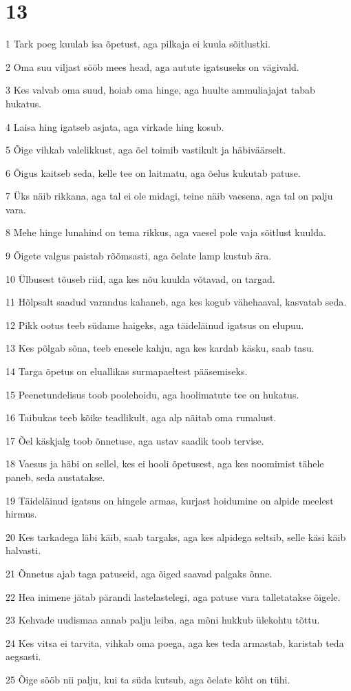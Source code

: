 \chapter{13}

\par 1 Tark poeg kuulab isa õpetust, aga pilkaja ei kuula sõitlustki.
\par 2 Oma suu viljast sööb mees head, aga autute igatsuseks on vägivald.
\par 3 Kes valvab oma suud, hoiab oma hinge, aga huulte ammuliajajat tabab hukatus.
\par 4 Laisa hing igatseb asjata, aga virkade hing kosub.
\par 5 Õige vihkab valelikkust, aga õel toimib vastikult ja häbiväärselt.
\par 6 Õigus kaitseb seda, kelle tee on laitmatu, aga õelus kukutab patuse.
\par 7 Üks näib rikkana, aga tal ei ole midagi, teine näib vaesena, aga tal on palju vara.
\par 8 Mehe hinge lunahind on tema rikkus, aga vaesel pole vaja sõitlust kuulda.
\par 9 Õigete valgus paistab rõõmsasti, aga õelate lamp kustub ära.
\par 10 Ülbusest tõuseb riid, aga kes nõu kuulda võtavad, on targad.
\par 11 Hõlpsalt saadud varandus kahaneb, aga kes kogub vähehaaval, kasvatab seda.
\par 12 Pikk ootus teeb südame haigeks, aga täideläinud igatsus on elupuu.
\par 13 Kes põlgab sõna, teeb enesele kahju, aga kes kardab käsku, saab tasu.
\par 14 Targa õpetus on eluallikas surmapaeltest pääsemiseks.
\par 15 Peenetundelisus toob poolehoidu, aga hoolimatute tee on hukatus.
\par 16 Taibukas teeb kõike teadlikult, aga alp näitab oma rumalust.
\par 17 Õel käskjalg toob õnnetuse, aga ustav saadik toob tervise.
\par 18 Vaesus ja häbi on sellel, kes ei hooli õpetusest, aga kes noomimist tähele paneb, seda austatakse.
\par 19 Täideläinud igatsus on hingele armas, kurjast hoidumine on alpide meelest hirmus.
\par 20 Kes tarkadega läbi käib, saab targaks, aga kes alpidega seltsib, selle käsi käib halvasti.
\par 21 Õnnetus ajab taga patuseid, aga õiged saavad palgaks õnne.
\par 22 Hea inimene jätab pärandi lastelastelegi, aga patuse vara talletatakse õigele.
\par 23 Kehvade uudismaa annab palju leiba, aga mõni hukkub ülekohtu tõttu.
\par 24 Kes vitsa ei tarvita, vihkab oma poega, aga kes teda armastab, karistab teda aegsasti.
\par 25 Õige sööb nii palju, kui ta süda kutsub, aga õelate kõht on tühi.

